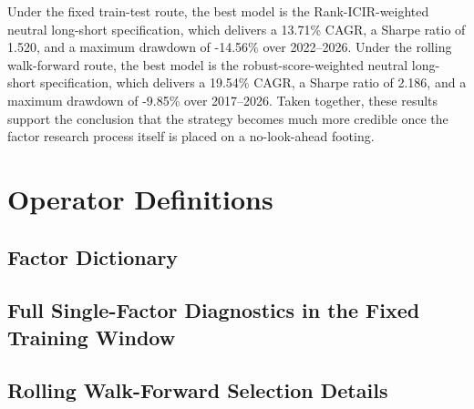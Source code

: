 \documentclass[11pt]{article}
\begin{document}
Under the fixed train-test route, the best model is the Rank-ICIR-weighted neutral long-short specification, which delivers a 13.71\% CAGR, a Sharpe ratio of 1.520, and a maximum drawdown of -14.56\% over 2022--2026. Under the rolling walk-forward route, the best model is the robust-score-weighted neutral long-short specification, which delivers a 19.54\% CAGR, a Sharpe ratio of 2.186, and a maximum drawdown of -9.85\% over 2017--2026. Taken together, these results support the conclusion that the strategy becomes much more credible once the factor research process itself is placed on a no-look-ahead footing.

\appendix

\section{Operator Definitions}
\label{app:operators}


\begin{landscape}
\section{Factor Dictionary}
\label{app:factor_dict}

\end{landscape}

\begin{landscape}
\section{Full Single-Factor Diagnostics in the Fixed Training Window}
\label{app:single_factor}

\end{landscape}

\begin{landscape}
\section{Rolling Walk-Forward Selection Details}
\label{app:selection_details}

\end{landscape}

\nocite{worldquant_101_alphas,haitong_two_sided_volatility_2017,gtja_short_cycle_price_volume_2017,pacific_generalized_reversal_2024,northeast_fund_leverage_2024,huatai_momentum_2016,huatai_turnover_2017,huatai_volatility_2017}


\end{document}
